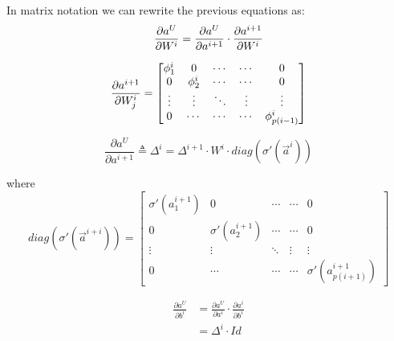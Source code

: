In matrix notation we can rewrite the previous equations as:
\begin{equation}
 \frac{\partial a^U}{\partial W^i} = \frac{\partial a^U}{\partial a^{i+1}} \cdot \frac{\partial a^{i+1}}{\partial W^i}
\end{equation}


\begin{equation}
\frac{\partial a^{i+1}}{\partial W_j^i} =
 \begin{bmatrix}
   \phi_1^{i}    & 0                & \cdots      & \cdots       & 0  \\
   0               & \phi_2^{i}     & \cdots      & \cdots       & 0  \\
   \vdots          & \vdots           & \ddots      & \vdots       &\vdots\\
   0               & \cdots           & \cdots      & \cdots       & \phi^{i}_{p(i-1)}
\end{bmatrix}
\end{equation}

\begin{equation}
\frac{\partial a^U}{\partial a^{i+1}} \triangleq \Delta^i = \Delta^{i+1}  \cdot W^{i} \cdot diag(\sigma'(\vec{a}^{i}))
\end{equation}

where
\begin{equation}
diag(\sigma'(\vec{a}^{i+i})) =
 \begin{bmatrix}
   \sigma'(a^{i+1}_1)    & 0                & \cdots      & \cdots       & 0  \\
   0                     & \sigma'(a^{i+1}_2)     & \cdots      & \cdots       & 0  \\
   \vdots                & \vdots           & \ddots      & \vdots       &\vdots\\
   0                     & \cdots           & \cdots      & \cdots       &\sigma'(a^{i+1}_{p(i+1)})
\end{bmatrix}
\end{equation}

\begin{align}
\frac{\partial a^U}{\partial b^i} &= \frac{\partial a^U}{\partial a^i} \cdot \frac{\partial a^i}{\partial b^i}\\
&= \Delta^{i} \cdot Id
\end{align}
